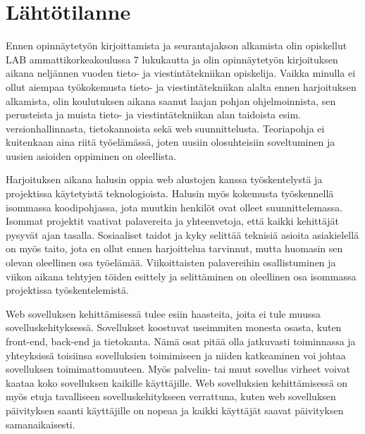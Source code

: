 \documentclass[11pt,a4paper,titlepage,oneside]{article}
\begin{document}
\newpage
\section{Lähtötilanne}         %




Ennen opinnäytetyön kirjoittamista ja seurantajakson alkamista olin opiskellut LAB ammattikorkeakoulussa 7 lukukautta ja
olin opinnäytetyön kirjoituksen aikana neljännen vuoden tieto- ja viestintätekniikan opiskelija.
Vaikka minulla ei ollut aiempaa työkokemusta tieto- ja viestintätekniikan alalta ennen harjoituksen alkamista,
olin koulutuksen aikana saanut laajan pohjan ohjelmoinnista,
sen perusteista ja muista tieto- ja viestintätekniikan alan taidoista esim. versionhallinnasta, tietokannoista sekä web suunnittelusta.
Teoriapohja ei kuitenkaan aina riitä työelämässä, joten uusiin olosuhteisiin soveltuminen ja uusien asioiden oppiminen on oleellista.
\medskip



Harjoituksen aikana halusin oppia web alustojen kanssa työskentelystä ja projektissa käytetyistä teknologioista.
Halusin myös kokemusta työskennellä isommassa koodipohjassa, jota muutkin henkilöt ovat olleet suunnittelemassa.
Isommat projektit vaativat palavereita ja yhteenvetoja, että kaikki kehittäjät pysyvät ajan tasalla.
Sosiaaliset taidot ja kyky selittää teknisiä asioita asiakielellä on myös taito, 
jota en ollut ennen harjoittelua tarvinnut, mutta huomasin sen olevan oleellinen osa työelämää.
Viikoittaisten palavereihin osallistuminen ja viikon aikana tehtyjen töiden esittely ja selittäminen on oleellinen osa isommassa projektissa työskentelemistä.
\medskip


Web sovelluksen kehittämisessä tulee esiin haasteita, joita ei tule muussa sovelluskehityksessä.
Sovellukset koostuvat useimmiten monesta osasta, kuten front-end, back-end ja tietokanta.
Nämä osat pitää olla jatkuvasti toiminnassa ja yhteyksissä toisiinsa sovelluksien toimimiseen ja niiden katkeaminen voi
johtaa sovelluksen toimimattomuuteen.
Myös palvelin- tai muut sovellus virheet voivat kaataa koko sovelluksen kaikille käyttäjille. 
Web sovelluksien kehittämisessä on myös etuja tavalliseen sovelluskehitykseen verrattuna, kuten 
web sovelluksen päivityksen saanti käyttäjille on nopeaa ja kaikki käyttäjät saavat päivityksen samanaikaisesti.
\medskip
\end{document}

